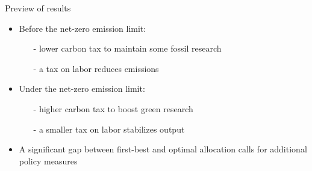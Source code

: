 \documentclass[11pt,aspectratio=169]{beamer}
\newcommand{\tr}[1]{\textcolor{blue}{#1}}
\begin{document}
\begin{frame}{Preview of results}
	\vspace{-3mm}
	\pause
	\begin{itemize}[<+-| alert@+>]
		\item Before the net-zero emission limit: 
		\begin{itemize}
			\item[-] lower carbon tax to maintain some fossil research %
			\item[-] a tax on labor reduces emissions
		\end{itemize}
		\vspace{3mm}
		\item Under the net-zero emission limit: 
		\begin{itemize}
			\item[-]  higher carbon tax to boost green research
			\item[-]  a smaller tax on labor stabilizes output
		\end{itemize}
		\vspace{3mm}
		\item A significant gap between first-best and optimal allocation calls for additional policy measures
\end{itemize}
\end{frame}
\end{document}
